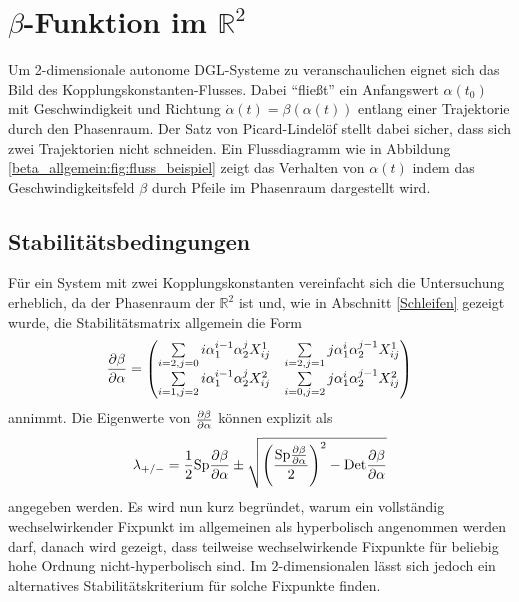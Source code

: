\clearpage
\section{$\beta$-Funktion im $\mathbb{R}^2$}\label{beta_im_R2}
   Um 2-dimensionale autonome DGL-Systeme zu veranschaulichen eignet sich das 
   Bild des Kopplungskonstanten-Flusses. Dabei "`fließt"' ein Anfangswert 
   $\alpha(t_0)$ mit Geschwindigkeit und Richtung $\dot\alpha(t) = 
   \beta(\alpha(t))$ entlang einer Trajektorie durch 
   den Phasenraum. Der Satz von Picard-Lindelöf stellt dabei sicher, dass 
   sich zwei Trajektorien nicht schneiden. Ein Flussdiagramm wie in Abbildung 
   \ref{beta_allgemein:fig:fluss_beispiel} zeigt das Verhalten von $\alpha(t)$ 
   indem das Geschwindigkeitsfeld $\beta$ durch Pfeile im Phasenraum 
   dargestellt wird.
   

  \subsection{Stabilitätsbedingungen}
    Für ein System mit zwei Kopplungskonstanten vereinfacht sich die 
    Untersuchung erheblich, da der Phasenraum der $\mathbb{R}^2$ ist und, wie in 
    Abschnitt \ref{Schleifen} gezeigt wurde, die Stabilitätsmatrix allgemein 
    die Form
	\begin{equation}
	 \frac{\partial \beta}{\partial \alpha} = \begin{pmatrix}
	          \sum\limits_{i=2,j=0}i \alpha_1^{i-1} \alpha_2^j X^1_{ij} &
	          \sum\limits_{i=2,j=1}j \alpha_1^i \alpha_2^{j-1} X^1_{ij}\\
	          \sum\limits_{i=1,j=2}i \alpha_1^{i-1} \alpha_2^j X^2_{ij} &
	          \sum\limits_{i=0,j=2}j \alpha_1^i \alpha_2^{j-1} X^2_{ij}
	         \end{pmatrix}\label{eq:beta_im_R2:stab_matrix}
	\end{equation}
    annimmt. Die Eigenwerte von $\frac{\partial \beta}{\partial \alpha}$ können explizit 
    als\begin{equation}
    \lambda_{+/-}=\frac12 \text{Sp} \frac{\partial \beta}{\partial \alpha} \pm \sqrt{ \left( \frac{\text{Sp} \frac{\partial \beta}{\partial \alpha}}{2} \right)^2-\text{Det} \frac{\partial \beta}{\partial \alpha} } 
    \label{eq:beta_im_R2:lambda}
    \end{equation}
    angegeben werden. Es wird nun kurz begründet, warum ein vollständig 
    wechselwirkender Fixpunkt im allgemeinen als hyperbolisch angenommen 
    werden darf, danach wird gezeigt, dass teilweise wechselwirkende Fixpunkte 
    für beliebig hohe Ordnung nicht-hyperbolisch sind. Im $2$-dimensionalen 
    lässt sich jedoch ein alternatives Stabilitätskriterium für solche 
    Fixpunkte finden.
